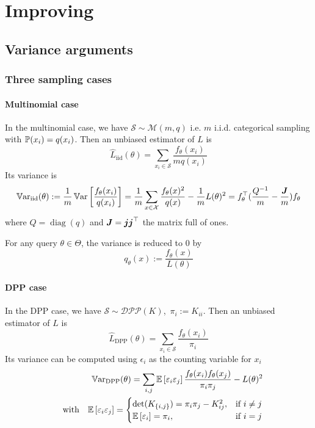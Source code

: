 \chapter{Improving}
\section{Variance arguments}
\subsection{Three sampling cases}
\subsubsection{Multinomial case}


In the multinomial case, we have $\mathcal S \sim \mathcal M(m, q)$ i.e. $m$ i.i.d. categorical sampling with $\mathbb{P}(x_i) = q(x_i)$.
Then an unbiased estimator of $L$ is
\begin{equation*}
	\hat L_{\textrm{iid}}(\theta) = \sum_{x_i\in \mathcal S} \frac{f_\theta(x_i)}{m q(x_i)}
\end{equation*}
Its variance is
\begin{equation}
	\operatorname{\mathbb V ar}_{\textrm{iid}}(\theta) :=\frac{1}{m} \operatorname{\mathbb V ar}\left[\frac {f_{\theta}(x_i)} {q(x_i)}\right] 
	=\frac{1}{m} \sum_{x \in \mathcal{X}} \frac{f_{\theta}(x)^{2}}{q(x)} -\frac{1}{m} L(\theta)^{2} = f_\theta^\top(\frac{Q^{-1}} m - \frac{\boldsymbol{J}} m)f_\theta
\end{equation}
where $Q = \operatorname{diag}(q)$ and $\boldsymbol{J} = \boldsymbol{j} \boldsymbol{j} ^\top$ the matrix full of ones. 

For any query $\theta \in \Theta$, the variance is reduced to 0 by
$$
q_{\theta}(x):=\frac{ f_{\theta}(x)}{L(\theta)}
$$


\subsubsection{DPP case}
In the DPP case, we have $ \mathcal S \sim \mathcal{DPP}(K)$, \,$\pi_i := K_{ii}$. Then an unbiased estimator of $L$ is
\begin{equation*}
	\hat L_{\textrm{DPP}}(\theta) = \sum_{x_i\in \mathcal S} \frac{f_\theta(x_i)}{\pi_i}
\end{equation*}
Its variance can be computed using $\epsilon_i$ as the counting variable for $x_i$
\begin{align*}
	\operatorname{\mathbb V ar}_{\textrm{DPP}}(\theta)
=\sum_{i, j}\mathbb{E}\left[\varepsilon_{i} \varepsilon_{j}\right] \frac{f_\theta(x_{i}) f_\theta(x_{j})} {\pi_{i} \pi_{j}}  - L(\theta)^{2}\\
\quad \text{with} \quad
\mathbb{E}\left[\varepsilon_{i} \varepsilon_{j}\right]=
\begin{cases}
	\det(K_{\{i, j\}})=\pi_{i} \pi_{j}-K_{ij}^{2}, & \text{if } i \neq j \\
	\mathbb{E}\left[\varepsilon_{i}\right]=\pi_{i},&\text{if } i = j
\end{cases}
\end{align*}



